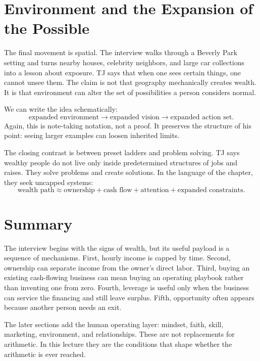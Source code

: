 \section{Environment and the Expansion of the Possible}

The final movement is spatial. The interview walks through a Beverly Park setting and turns nearby houses, celebrity neighbors, and large car collections into a lesson about exposure. TJ says that when one sees certain things, one cannot unsee them. The claim is not that geography mechanically creates wealth. It is that environment can alter the set of possibilities a person considers normal.

We can write the idea schematically:
\begin{equation}
\text{expanded environment} \longrightarrow
\text{expanded vision} \longrightarrow
\text{expanded action set}.
\end{equation}
Again, this is note-taking notation, not a proof. It preserves the structure of his point: seeing larger examples can loosen inherited limits.

The closing contrast is between preset ladders and problem solving. TJ says wealthy people do not live only inside predetermined structures of jobs and raises. They solve problems and create solutions. In the language of the chapter, they seek uncapped systems:
\begin{equation}
\text{wealth path} \approx
\text{ownership} + \text{cash flow} + \text{attention} + \text{expanded constraints}.
\end{equation}

\section{Summary}

The interview begins with the signs of wealth, but its useful payload is a sequence of mechanisms. First, hourly income is capped by time. Second, ownership can separate income from the owner's direct labor. Third, buying an existing cash-flowing business can mean buying an operating playbook rather than inventing one from zero. Fourth, leverage is useful only when the business can service the financing and still leave surplus. Fifth, opportunity often appears because another person needs an exit.

The later sections add the human operating layer: mindset, faith, skill, marketing, environment, and relationships. These are not replacements for arithmetic. In this lecture they are the conditions that shape whether the arithmetic is ever reached.